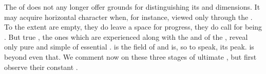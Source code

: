 \label{sub:SelfOne}
%
\pa The  of  does not any longer offer grounds
for distinguishing its  and  dimensions.  It may acquire
horizontal character when, for instance, viewed only through the .  To the extent  are {empty}, they do leave a
space for progress, they do call for being .  But true
, the ones which are experienced along with the  and
 of the \oss, reveal only pure and simple  of
essential .   is the field of  and
 is, so to speak, its peak.  is beyond even that.  We comment
now on these three stages of ultimate , but first observe
their constant .

